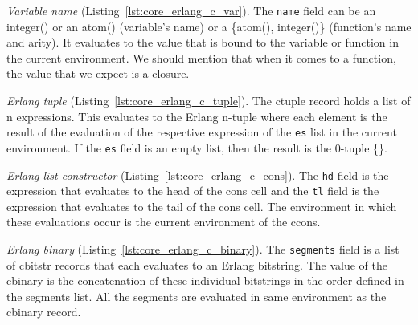 \emph{Variable name} (Listing~\ref{lst:core_erlang_c_var}).
The \texttt{name} field can be an integer() or an atom() (variable’s name) or a \{atom(),
integer()\} (function’s name and arity). It evaluates to the value that is bound
to the variable or function in the current environment. We should mention that
when it comes to a function, the value that we expect is a closure.



\emph{Erlang tuple} (Listing~\ref{lst:core_erlang_c_tuple}).
The c\textunderscore tuple record holds a list of n expressions. This evaluates to the Erlang
n-tuple where each element is the result of the evaluation of the respective
expression of the \texttt{es} list in the current environment. If the \texttt{es} field is an
empty list, then the result is the 0-tuple \{\}.



\emph{Erlang list constructor} (Listing~\ref{lst:core_erlang_c_cons}).
The \texttt{hd} field is the expression that evaluates to the head of the cons cell and
the \texttt{tl} field is the expression that evaluates to the tail of the cons cell. The
environment in which these evaluations occur is the current environment of the
c\textunderscore cons.



\emph{Erlang binary} (Listing~\ref{lst:core_erlang_c_binary}).
The \texttt{segments} field is a list of c\textunderscore bitstr records that each evaluates to an Erlang
bitstring. The value of the c\textunderscore binary is the concatenation of these individual
bitstrings in the order defined in the segments list. All the segments are
evaluated in same environment as the c\textunderscore binary record.



